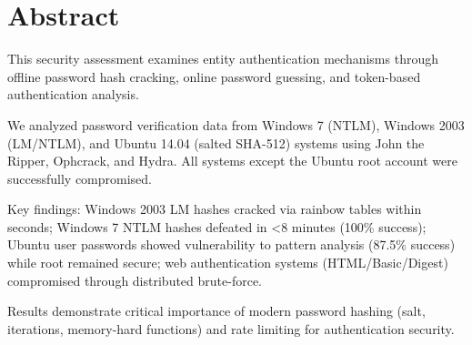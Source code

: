 \section*{Abstract}

This security assessment examines entity authentication mechanisms through offline password hash cracking, online password guessing, and token-based authentication analysis.

We analyzed password verification data from Windows 7 (NTLM), Windows 2003 (LM/NTLM), and Ubuntu 14.04 (salted SHA-512) systems using John the Ripper, Ophcrack, and Hydra. All systems except the Ubuntu root account were successfully compromised.

Key findings: Windows 2003 LM hashes cracked via rainbow tables within seconds; Windows 7 NTLM hashes defeated in <8 minutes (100\% success); Ubuntu user passwords showed vulnerability to pattern analysis (87.5\% success) while root remained secure; web authentication systems (HTML/Basic/Digest) compromised through distributed brute-force.

Results demonstrate critical importance of modern password hashing (salt, iterations, memory-hard functions) and rate limiting for authentication security.